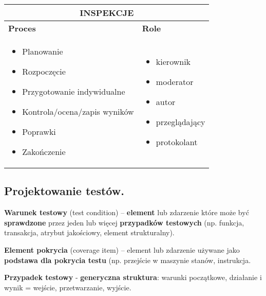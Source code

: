 \documentclass[../main.tex]{subfiles}
\begin{document}
    \begin{table}[H]
        \begin{center}
            \begin{tabular}{| p{8cm}| p{8cm}|}
                \hline
                \multicolumn{2}{|c|}{ \textbf{INSPEKCJE}}\\
                \hline
                \textbf{Proces} & \textbf{Role}\\
                \hline
                \begin{itemize}
                    \item Planowanie
                    \item Rozpoczęcie
                    \item Przygotowanie indywidualne
                    \item Kontrola/ocena/zapis wyników
                    \item Poprawki
                    \item Zakończenie
                \end{itemize}
                &
                \begin{itemize}
                    \item kierownik
                    \item moderator
                    \item autor
                    \item przeglądający
                    \item protokolant
                \end{itemize}\\
                \hline
            \end{tabular}
        \end{center}
    \end{table}


    \subsection{Projektowanie testów.}
    \textbf{Warunek testowy} (test condition) – \textbf{element} lub zdarzenie które może być
    \textbf{sprawdzone} przez jeden lub więcej \textbf{przypadków testowych} (np. funkcja,
    transakcja, atrybut jakościowy, element strukturalny).

    \textbf{Element pokrycia} (coverage item) – element lub zdarzenie używane jako
    \textbf{podstawa dla pokrycia testu} (np. przejście w maszynie stanów, instrukcja.

    \textbf{Przypadek testowy} - \textbf{generyczna struktura}: warunki początkowe, działanie i wynik = wejście, przetwarzanie, wyjście.
\end{document}
